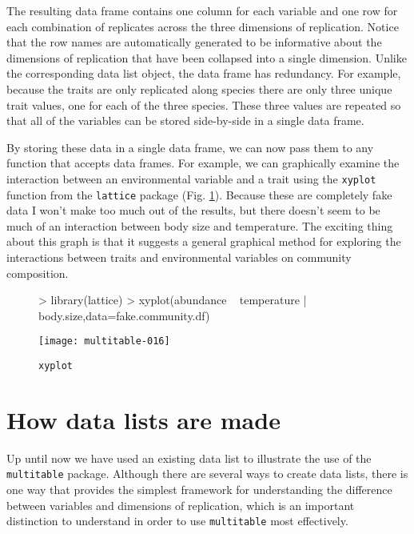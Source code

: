 \documentclass{article}
\newcommand{\code}[1]{\texttt{#1}}
\numberwithin{exercise}{section}
\begin{document}
The resulting data frame contains one column for each variable and one row for each combination of replicates across the three dimensions of replication.  Notice that the row names are automatically generated to be informative about the dimensions of replication that have been collapsed into a single dimension.  Unlike the corresponding data list object, the data frame has redundancy.  For example, because the traits are only replicated along species there are only three unique trait values, one for each of the three species.  These three values are repeated so that all of the variables can be stored side-by-side in a single data frame.

By storing these data in a single data frame, we can now pass them to any function that accepts data frames.  For example, we can graphically examine the interaction between an environmental variable and a trait using the \code{xyplot} function from the \code{lattice} package (Fig. \ref{fig:xyplot}).  Because these are completely fake data I won't make too much out of the results, but there doesn't seem to be much of an interaction between body size and temperature.  The exciting thing about this graph is that it suggests a general graphical method for exploring the interactions between traits and environmental variables on community composition.

\begin{figure}
\begin{Schunk}
\begin{Sinput}
> library(lattice)
> xyplot(abundance ~ temperature | body.size,data=fake.community.df)
\end{Sinput}
\end{Schunk}
\texttt{[image: multitable-016]}
\caption{\code{xyplot}}
\label{fig:xyplot}
\end{figure}

\section{How data lists are made}

Up until now we have used an existing data list to illustrate the use of the \code{multitable} package.  Although there are several ways to create data lists, there is one way that provides the simplest framework for understanding the difference between variables and dimensions of replication, which is an important distinction to understand in order to use \code{multitable} most effectively. 
\end{document}
